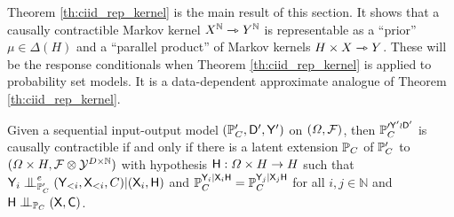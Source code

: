 Theorem \ref{th:ciid_rep_kernel} is the main result of this section. It shows that a causally contractible Markov kernel $X^{\mathbb{N}}\rightarrowtriangle Y^{\mathbb{N}}$ is representable as a ``prior'' $\mu\in \Delta(H)$ and a ``parallel product'' of Markov kernels $H\times X\rightarrowtriangle Y$. These will be the response conditionals when Theorem \ref{th:ciid_rep_kernel} is applied to probability set models. It is a data-dependent approximate analogue of Theorem \ref{th:ciid_rep_kernel}.

\begin{theorem}\label{th:response_is_cc_hdep}
Given a sequential input-output model $(\mathbb{P}_C',\mathsf{D}',\mathsf{Y}')$ on $(\Omega,\mathcal{F})$, then $\mathbb{P}_C^{\prime \mathsf{Y}'\wr \mathsf{D}'}$ is causally contractible if and only if there is a latent extension $\mathbb{P}_C$ of $\mathbb{P}_C'$ to $(\Omega\times H,\mathcal{F}\otimes\mathcal{Y}^{D\times\mathbb{N}})$ with hypothesis $\mathsf{H}:\Omega\times H\to H$ such that $\RV{Y}_i\CI^e_{\prob{P}_C'} (\RV{Y}_{<i},\RV{X}_{<i},C)|(\RV{X}_i,\RV{H})$ and $\mathbb{P}_C^{\mathsf{Y}_i|\mathsf{X}_i\mathsf{H}}=\mathbb{P}_C^{\mathsf{Y}_j|\mathsf{X}_j\mathsf{H}}$ for all $i,j\in \mathbb{N}$ and $\RV{H}\CI_{\prob{P}_C} (\RV{X},\RV{C})$.
\end{theorem}

